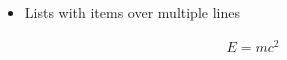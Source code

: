 \documentclass{article}
\begin{document}
\begin{itemize}
\item Lists with items
over multiple lines
\end{itemize}

\begin{align}
E = m c^2
\end{align}
\end{document}
